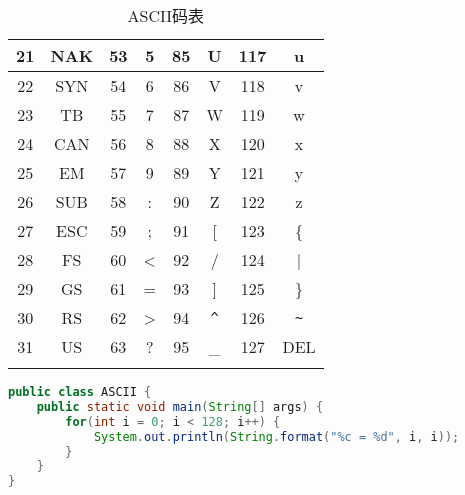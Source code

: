 \begin{longtable}{|c|c|c|c|c|c|c|c|}
	\hline
	21             & NAK           & 53             & 5             & 85             & U                      & 117            & u                      \\
	\hline
	22             & SYN           & 54             & 6             & 86             & V                      & 118            & v                      \\
	\hline
	23             & TB            & 55             & 7             & 87             & W                      & 119            & w                      \\
	\hline
	24             & CAN           & 56             & 8             & 88             & X                      & 120            & x                      \\
	\hline
	25             & EM            & 57             & 9             & 89             & Y                      & 121            & y                      \\
	\hline
	26             & SUB           & 58             & :             & 90             & Z                      & 122            & z                      \\
	\hline
	27             & ESC           & 59             & ;             & 91             & [                      & 123            & \{                     \\
			\hline
	28             & FS            & 60             & <             & 92             & /                      & 124            & |                      \\
			\hline
	29             & GS            & 61             & =             & 93             & ]                      & 125            & \}                     \\
	\hline
	30             & RS            & 62             & >             & 94             & \lstinline|^| & 126            & \lstinline|~| \\
	\hline
	31             & US            & 63             & ?             & 95             & \_                     & 127            & DEL                    \\
	\hline
	\caption{ASCII码表}
\end{longtable}


\begin{lstlisting}[language=Java]
public class ASCII {
	public static void main(String[] args) {
		for(int i = 0; i < 128; i++) {
			System.out.println(String.format("%c = %d", i, i));
		}
	}
}
\end{lstlisting}


